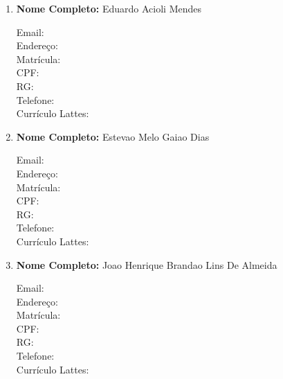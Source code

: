 \documentclass[a4paper,12pt]{article} %
\begin{document}
\begin{enumerate}
    \item \textbf{Nome Completo:} Eduardo Acioli Mendes
    \begin{description}
        \item [Email:] 
        \item [Endereço:]
        \item [Matrícula:]
        \item [CPF:]
        \item [RG:]
        \item [Telefone:]
        \item [Currículo Lattes:]
    \end{description}

    \item \textbf{Nome Completo:} Estevao Melo Gaiao Dias
    \begin{description}
        \item [Email:] 
        \item [Endereço:]
        \item [Matrícula:]
        \item [CPF:]
        \item [RG:]
        \item [Telefone:]
        \item [Currículo Lattes:]
    \end{description}

    \item \textbf{Nome Completo:} Joao Henrique Brandao Lins De Almeida
    \begin{description}
        \item [Email:] 
        \item [Endereço:]
        \item [Matrícula:]
        \item [CPF:]
        \item [RG:]
        \item [Telefone:]
        \item [Currículo Lattes:]
    \end{description}



\end{enumerate}
\end{document}
